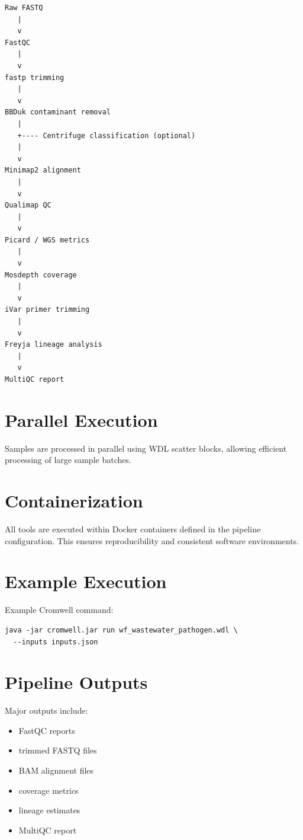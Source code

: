 \documentclass[11pt]{article}
\begin{document}
\begin{verbatim}
Raw FASTQ
   |
   v
FastQC
   |
   v
fastp trimming
   |
   v
BBDuk contaminant removal
   |
   +---- Centrifuge classification (optional)
   |
   v
Minimap2 alignment
   |
   v
Qualimap QC
   |
   v
Picard / WGS metrics
   |
   v
Mosdepth coverage
   |
   v
iVar primer trimming
   |
   v
Freyja lineage analysis
   |
   v
MultiQC report
\end{verbatim}

\section{Parallel Execution}

Samples are processed in parallel using WDL scatter blocks, allowing efficient processing of large sample batches.

\section{Containerization}

All tools are executed within Docker containers defined in the pipeline configuration. This ensures reproducibility and consistent software environments.

\section{Example Execution}

Example Cromwell command:

\begin{lstlisting}
java -jar cromwell.jar run wf_wastewater_pathogen.wdl \
  --inputs inputs.json
\end{lstlisting}

\section{Pipeline Outputs}

Major outputs include:

\begin{itemize}
\item FastQC reports
\item trimmed FASTQ files
\item BAM alignment files
\item coverage metrics
\item lineage estimates
\item MultiQC report
\end{itemize}
\end{document}
